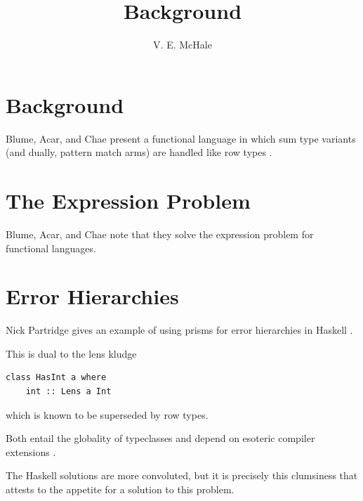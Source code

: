\documentclass{article}
\begin{document}
\title{Background}
\author {V. E. McHale}
\maketitle

\tableofcontents


\section{Background}

Blume, Acar, and Chae present a functional language in which sum type variants (and dually, pattern match arms) are handled like row types \cite{blume2006}.




\section{The Expression Problem}

Blume, Acar, and Chae note that they solve the expression problem for functional languages.




\section{Error Hierarchies}

Nick Partridge gives an example of using prisms for error hierarchies in Haskell \cite{errorprisms}.

This is dual \cite{jle} to the lens kludge

\begin{verbatim}
class HasInt a where
    int :: Lens a Int
\end{verbatim}

which is known to be superseded by row types.

Both entail the globality of typeclasses and depend on esoteric compiler extensions \cite{ghc}.

The Haskell solutions are more convoluted, but it is precisely this clumsiness that attests to the appetite for a solution to this problem.



\end{document}
